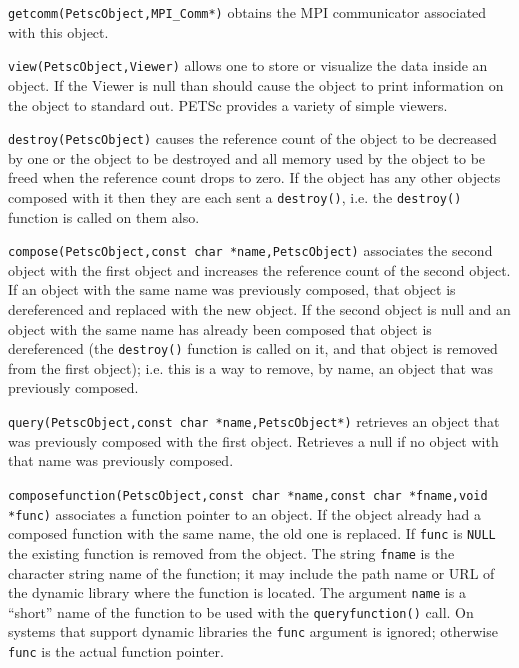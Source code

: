 \begin{tightitemize}
\item \lstinline{getcomm(PetscObject,MPI_Comm*)} obtains the MPI communicator associated
      with this object.

\item \lstinline{view(PetscObject,Viewer)} allows one to store or visualize the data inside
      an object. If the Viewer is null than should cause the object to print
      information on the object to standard out. PETSc provides a variety of simple
      viewers.

\item \lstinline{destroy(PetscObject)} causes the reference count of the object to be decreased
      by one or the object to be destroyed and all memory used by the object to be freed when
      the reference count drops to zero.
      If the object has any other objects composed with it then they are each sent a
      \lstinline{destroy()}, i.e. the \lstinline{destroy()} function is called on them also.

\item \lstinline{compose(PetscObject,const char *name,PetscObject)} associates the second object with
      the first object and increases the reference count of the second object. If an
      object with the
      same name was previously composed, that object is dereferenced and replaced with
      the new object. If the
      second object is null and an object with the same name has already been
      composed that object is dereferenced (the \lstinline{destroy()} function is called on
      it, and that object is removed from the first object); i.e. this is a way to
      remove, by name, an object that was previously composed.

\item \lstinline{query(PetscObject,const char *name,PetscObject*)} retrieves an object that was
      previously composed with the first object. Retrieves a null if no object with
      that name was previously composed.

\item \lstinline{composefunction(PetscObject,const char *name,const char *fname,void *func)} associates a function
      pointer to an object. If the object already had a composed function with the
      same name, the old one is replaced. If \lstinline{func} is \lstinline{NULL} the existing function is removed from
      the object. The string \lstinline{fname} is the character string name of the function;
      it may include the path name or URL of the dynamic library where the function is located.
      The argument \lstinline{name} is a ``short'' name of the function to be used with the
      \lstinline{queryfunction()} call. On systems that support dynamic libraries the \lstinline{func}
      argument is ignored; otherwise \lstinline{func} is the actual function pointer.


\end{tightitemize}
